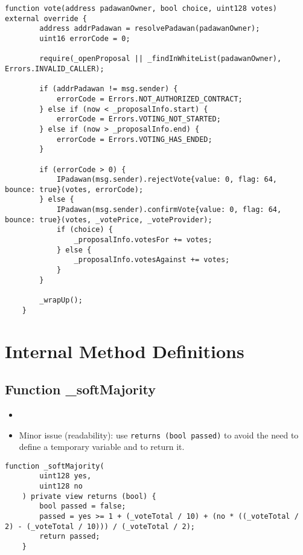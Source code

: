 \begin{lstlisting}[firstnumber=84]
    function vote(address padawanOwner, bool choice, uint128 votes) external override {
        address addrPadawan = resolvePadawan(padawanOwner);
        uint16 errorCode = 0;

        require(_openProposal || _findInWhiteList(padawanOwner), Errors.INVALID_CALLER);

        if (addrPadawan != msg.sender) {
            errorCode = Errors.NOT_AUTHORIZED_CONTRACT;
        } else if (now < _proposalInfo.start) {
            errorCode = Errors.VOTING_NOT_STARTED;
        } else if (now > _proposalInfo.end) {
            errorCode = Errors.VOTING_HAS_ENDED;
        }

        if (errorCode > 0) {
            IPadawan(msg.sender).rejectVote{value: 0, flag: 64, bounce: true}(votes, errorCode);
        } else {
            IPadawan(msg.sender).confirmVote{value: 0, flag: 64, bounce: true}(votes, _votePrice, _voteProvider);
            if (choice) {
                _proposalInfo.votesFor += votes;
            } else {
                _proposalInfo.votesAgainst += votes;
            }
        }

        _wrapUp();
    }
\end{lstlisting}

\section{Internal Method Definitions}

\subsection{Function \_{}softMajority}

\begin{itemize}
\item {}
\item Minor issue (readability): use {\tt returns (bool passed)} to
  avoid the need to define a temporary variable and to return it.
\end{itemize}

\begin{lstlisting}[firstnumber=170]
    function _softMajority(
        uint128 yes,
        uint128 no
    ) private view returns (bool) {
        bool passed = false;
        passed = yes >= 1 + (_voteTotal / 10) + (no * ((_voteTotal / 2) - (_voteTotal / 10))) / (_voteTotal / 2);
        return passed;
    }
\end{lstlisting}


